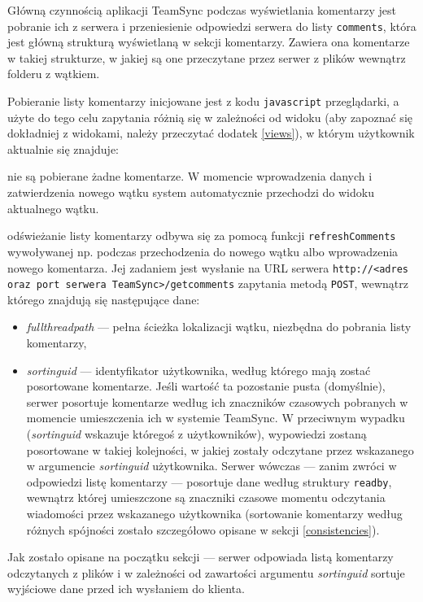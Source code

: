Główną czynnością aplikacji TeamSync podczas wyświetlania komentarzy jest pobranie ich z serwera i przeniesienie odpowiedzi serwera do listy \texttt{comments}, która jest główną strukturą wyświetlaną w sekcji komentarzy. Zawiera ona komentarze w takiej strukturze, w jakiej są one przeczytane przez serwer z plików wewnątrz folderu z wątkiem.

Pobieranie listy komentarzy inicjowane jest z kodu \texttt{javascript} przeglądarki, a użyte do tego celu zapytania różnią się w zależności od widoku (aby zapoznać się dokładniej z widokami, należy przeczytać dodatek \ref{views}), w którym użytkownik aktualnie się znajduje:

\begin{description}[noitemsep]
  \item[W widoku nowego wątku] nie są pobierane żadne komentarze. W momencie wprowadzenia danych i zatwierdzenia nowego wątku system automatycznie przechodzi do widoku aktualnego wątku.
  
  \item[W widoku aktualnego wątku] odświeżanie listy komentarzy odbywa się za pomocą funkcji \texttt{re\-freshComments} wywoływanej np. podczas przechodzenia do nowego wątku albo wprowadzenia nowego komentarza. Jej zadaniem jest wysłanie na URL serwera \texttt{http://<adres oraz port serwera TeamSync>\-/getcomments} zapytania metodą \texttt{POST}, wewnątrz którego znajdują się następujące dane:
  \begin{itemize}[noitemsep]
    \item \emph{fullthreadpath} --- pełna ścieżka lokalizacji wątku, niezbędna do pobrania listy komentarzy,
    \item \emph{sortinguid} --- identyfikator użytkownika, według którego mają zostać posortowane komentarze. Jeśli wartość ta pozostanie pusta (domyślnie), serwer posortuje komentarze według ich znaczników czasowych pobranych w momencie umieszczenia ich w systemie TeamSync. W przeciwnym wypadku (\emph{sortinguid} wskazuje któregoś z użytkowników), wypowiedzi zostaną posortowane w takiej kolejności, w jakiej zostały odczytane przez wskazanego w argumencie \emph{sortinguid} użytkownika. Serwer wówczas --- zanim zwróci w odpowiedzi listę komentarzy --- posortuje dane według struktury \texttt{readby}, wewnątrz której umieszczone są znaczniki czasowe momentu odczytania wiadomości przez wskazanego użytkownika (sortowanie komentarzy według różnych spójności zostało szczegółowo opisane w sekcji \ref{consistencies}).
  \end{itemize}
  Jak zostało opisane na początku sekcji --- serwer odpowiada listą komentarzy odczytanych z plików i w zależności od zawartości argumentu \emph{sortinguid} sortuje wyjściowe dane przed ich wysłaniem do klienta.


\end{description}
